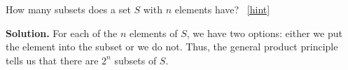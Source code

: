 \documentclass{book}
\begin{document}
\setcounter{project}{89}
\addtocounter{project}{-1}
\begin{activity}[]\label{SubsetsFirstTime}
\hypertarget{p-684}{}%
How many subsets does a set \(S\) with \(n\) elements have?%
~\hfill{\tiny\hyperlink{a-89}{[hint]}\hypertarget{q-89}{}}\par\smallskip%
\noindent\textbf{Solution.}\hypertarget{solution-66}{}\quad%
\hypertarget{p-686}{}%
For each of the \(n\) elements of \(S\), we have two options: either we put the element into the subset or we do not. Thus, the general product principle tells us that there are \(2^n\) subsets of \(S\).%
\end{activity}
\end{document}
